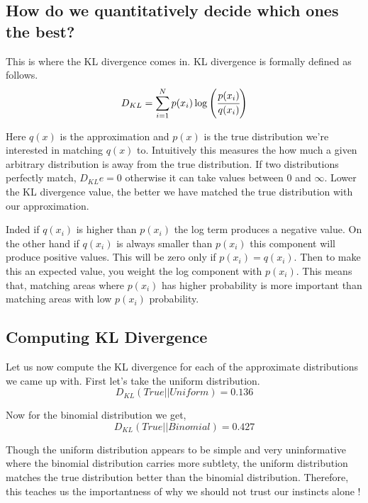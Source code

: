 \subsection{How do we quantitatively decide which ones the best?}

This is where the KL divergence comes in. KL divergence is formally defined as follows.
\begin{equation}
  D_{KL} = \sum_{i=1}^{N} p(x_i)\log\left(\cfrac{p(x_i)}{q(x_i)}\right)
\end{equation}

Here $q(x)$ is the approximation and $p(x)$ is the true distribution we’re interested in matching $q(x)$ to. Intuitively this measures the how much a given arbitrary distribution is away from the true distribution. If two distributions perfectly match, $D_{KL}e = 0$ otherwise it can take values between 0 and $\infty$. Lower the KL divergence value, the better we have matched the true distribution with our approximation.

Inded if $q(x_i)$ is higher than $p(x_i)$ the log term produces a negative value. On the other hand if $q(x_i)$ is always smaller than $p(x_i)$ this component will produce positive values. This will be zero only if $p(x_i)=q(x_i)$. Then to make this an expected value, you weight the log component with $p(x_i)$. This means that, matching areas where $p(x_i)$ has higher probability is more important than matching areas with low $p(x_i)$ probability.

\subsection{Computing KL Divergence}
Let us now compute the KL divergence for each of the approximate distributions we came up with. First let’s take the uniform distribution.
\begin{equation*}
D_{KL}(True||Uniform) = 0.136
\end{equation*}

Now for the binomial distribution we get,
\begin{equation*}
D_{KL}(True||Binomial) = 0.427
\end{equation*}

Though the uniform distribution appears to be simple and very uninformative where the binomial distribution carries more subtlety, the uniform distribution matches the true distribution better than the binomial distribution. Therefore, this teaches us the importantness of why we should not trust our instincts alone !

